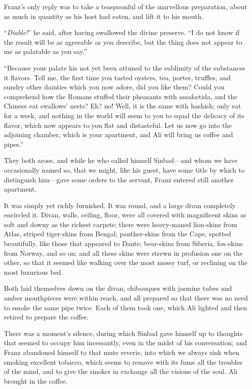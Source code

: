 Franz’s only reply was to take a teaspoonful of the marvellous
preparation, about as much in quantity as his host had eaten, and lift
it to his mouth.

“\textit{Diable!}” he said, after having swallowed the divine preserve. “I do
not know if the result will be as agreeable as you describe, but the
thing does not appear to me as palatable as you say.”

“Because your palate his not yet been attuned to the sublimity of the
substances it flavors. Tell me, the first time you tasted oysters, tea,
porter, truffles, and sundry other dainties which you now adore, did
you like them? Could you comprehend how the Romans stuffed their
pheasants with assafœtida, and the Chinese eat swallows’ nests? Eh? no!
Well, it is the same with hashish; only eat for a week, and nothing in
the world will seem to you to equal the delicacy of its flavor, which
now appears to you flat and distasteful. Let us now go into the
adjoining chamber, which is your apartment, and Ali will bring us
coffee and pipes.”

They both arose, and while he who called himself Sinbad—and whom we
have occasionally named so, that we might, like his guest, have some
title by which to distinguish him—gave some orders to the servant,
Franz entered still another apartment.

It was simply yet richly furnished. It was round, and a large divan
completely encircled it. Divan, walls, ceiling, floor, were all covered
with magnificent skins as soft and downy as the richest carpets; there
were heavy-maned lion-skins from Atlas, striped tiger-skins from
Bengal; panther-skins from the Cape, spotted beautifully, like those
that appeared to Dante; bear-skins from Siberia, fox-skins from Norway,
and so on; and all these skins were strewn in profusion one on the
other, so that it seemed like walking over the most mossy turf, or
reclining on the most luxurious bed.

Both laid themselves down on the divan; chibouques with jasmine tubes
and amber mouthpieces were within reach, and all prepared so that there
was no need to smoke the same pipe twice. Each of them took one, which
Ali lighted and then retired to prepare the coffee.

There was a moment’s silence, during which Sinbad gave himself up to
thoughts that seemed to occupy him incessantly, even in the midst of
his conversation; and Franz abandoned himself to that mute reverie,
into which we always sink when smoking excellent tobacco, which seems
to remove with its fume all the troubles of the mind, and to give the
smoker in exchange all the visions of the soul. Ali brought in the
coffee.

